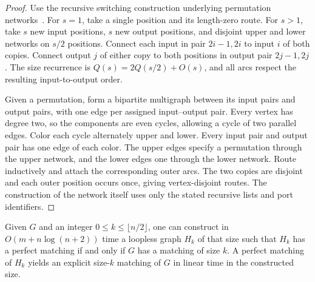 \begin{proof}
Use the recursive switching construction underlying permutation
networks~\cite{PermutationNetworks}. For $s=1$, take a single position and
its length-zero route. For $s>1$, take $s$ new input positions, $s$ new output
positions, and disjoint upper and lower networks on $s/2$ positions. Connect
each input in pair $2i-1,2i$ to input $i$ of both copies. Connect output $j$
of either copy to both positions in output pair $2j-1,2j$. The size recurrence
is $Q(s)=2Q(s/2)+O(s)$, and all arcs respect the resulting input-to-output
order.

Given a permutation, form a bipartite multigraph between its input pairs and
output pairs, with one edge per assigned input--output pair. Every vertex
has degree two, so the components are even cycles, allowing a cycle of two
parallel edges. Color each cycle alternately upper and lower. Every input
pair and output pair has one edge of each color. The upper edges specify a
permutation through the upper network, and the lower edges one through the
lower network. Route inductively and attach the corresponding outer arcs.
The two copies are disjoint and each outer position occurs once, giving
vertex-disjoint routes. The construction of the network itself uses only
the stated recursive lists and port identifiers.
\end{proof}

\begin{lemma}\label{uniform:cardinality}
Given $G$ and an integer $0\le k\le\lfloor n/2\rfloor$, one can construct
in $O(m+n\log(n+2))$ time a loopless graph $H_k$ of that size such that
$H_k$ has a perfect matching if and only if $G$ has a matching of size $k$.
A perfect matching of $H_k$ yields an explicit size-$k$ matching of $G$
in linear time in the constructed size.
\end{lemma}

